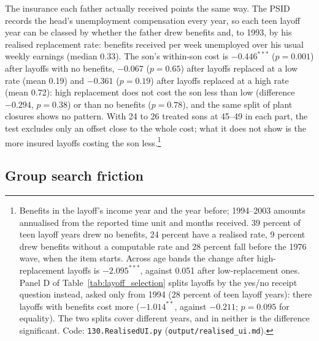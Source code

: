 The insurance each father actually received points the same way. The PSID records the head's unemployment
compensation every year, so each teen layoff year can be classed by whether the father drew benefits and, to 1993, by
his realised replacement rate: benefits received per week unemployed over his usual weekly earnings (median 0.33). The
son's within-son cost is $-0.446^{***}$ ($p = 0.001$) after layoffs with no benefits, $-0.067$ ($p = 0.65$) after
layoffs replaced at a low rate (mean 0.19) and $-0.361$ ($p = 0.19$) after layoffs replaced at a high rate (mean 0.72):
high replacement does not cost the son less than low (difference $-0.294$, $p = 0.38$) or than no benefits ($p =
0.78$), and the same split of plant closures shows no pattern. With 24 to 26 treated sons at 45--49 in each part, the
test excludes only an offset close to the whole cost; what it does not show is the more insured layoffs costing the son
less.\footnote{Benefits in the layoff's income year and the year before; 1994--2003 amounts annualised from the
reported time unit and months received. 39 percent of teen layoff years drew no benefits, 24 percent have a realised
rate, 9 percent drew benefits without a computable rate and 28 percent fall before the 1976 wave, when the item starts. Across age bands the change after high-replacement layoffs is $-2.095^{***}$, against 0.051 after low-replacement ones. Panel D of Table~\ref{tab:layoff_selection} splits layoffs by the yes/no receipt question instead, asked only from 1994 (28 percent of teen layoff years): there layoffs with benefits cost more ($-1.014^{**}$, against $-0.211$; $p = 0.095$ for equality). The two splits cover different years, and in neither is the difference significant. Code:
\texttt{130.RealisedUI.py} (\texttt{output/realised\_ui.md}).}

\subsection{Group search friction}

